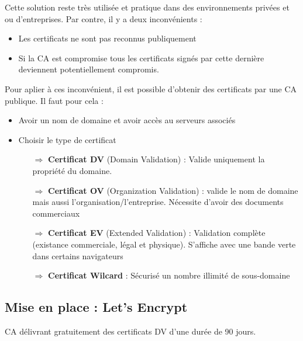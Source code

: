 \documentclass[french, 12pt]{article}%
\newcommand{\itemE}{\item[$\bullet$]}
\newcommand{\titreencadre}{Titre}
\newenvironment{encadre}[1]{\renewcommand{\titreencadre}{#1}
	\begin{mdframed}[style=encadrestyle]
	\vspace{0.5\baselineskip}
	}{%
	\end{mdframed}}
\begin{document}
Cette solution reste très utilisée et pratique dans des environnements privées et ou d'entreprises. Par contre, il y a deux inconvénients : 
\begin{itemize}
\itemE Les certificats ne sont pas reconnus publiquement
\itemE Si la CA est compromise tous les certificats signés par cette dernière deviennent potentiellement compromis.
\end{itemize}


Pour aplier à ces inconvénient, il est possible d'obtenir des certificats par une CA publique. Il faut pour cela :  
\begin{itemize}
\itemE Avoir un nom de domaine et avoir accès au serveurs associés
\itemE Choisir le type de certificat
	\begin{itemize}
	\item[$\Rightarrow$] \textbf{Certificat DV} (Domain Validation) : Valide uniquement la propriété du domaine. 
	\item[$\Rightarrow$] \textbf{Certificat OV} (Organization Validation) : valide le nom de domaine mais aussi l'organisation/l'entreprise. Nécessite d'avoir des documents commerciaux
	\item[$\Rightarrow$] \textbf{Certificat EV} (Extended Validation) : Validation complète (existance commerciale, légal et physique). S'affiche avec une bande verte dans certains navigateurs
	\item[$\Rightarrow$] \textbf{Certificat Wilcard} : Sécurisé un nombre illimité de sous-domaine
	\end{itemize}
\end{itemize}

\subsection{Mise en place : Let's Encrypt}

\begin{encadre}{Let's encrypt}
CA délivrant gratuitement des certificats DV d’une durée de 90 jours.
\end{encadre}
\end{document}
